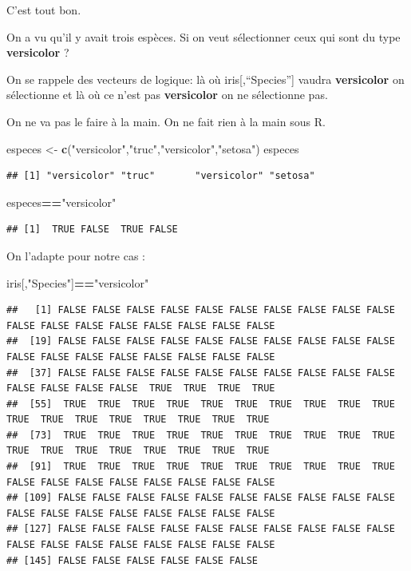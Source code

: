 \documentclass[
]{book}
\newenvironment{Shaded}{\begin{snugshade}}{\end{snugshade}}
\newcommand{\FunctionTok}[1]{\textcolor[rgb]{0.13,0.29,0.53}{\textbf{#1}}}
\newcommand{\NormalTok}[1]{#1}
\newcommand{\OtherTok}[1]{\textcolor[rgb]{0.56,0.35,0.01}{#1}}
\newcommand{\SpecialCharTok}[1]{\textcolor[rgb]{0.81,0.36,0.00}{\textbf{#1}}}
\newcommand{\StringTok}[1]{\textcolor[rgb]{0.31,0.60,0.02}{#1}}
\begin{document}
C'est tout bon.

On a vu qu'il y avait trois espèces. Si on veut sélectionner ceux qui sont du type
\textbf{versicolor} ?

On se rappele des vecteurs de logique: là où iris{[},``Species''{]} vaudra \textbf{versicolor}
on sélectionne et là où ce n'est pas \textbf{versicolor} on ne sélectionne pas.

On ne va pas le faire à la main. On ne fait rien à la main sous R.

\begin{Shaded}
\begin{Highlighting}[]
\NormalTok{especes }\OtherTok{\textless{}{-}} \FunctionTok{c}\NormalTok{(}\StringTok{"versicolor"}\NormalTok{,}\StringTok{"truc"}\NormalTok{,}\StringTok{"versicolor"}\NormalTok{,}\StringTok{"setosa"}\NormalTok{)}
\NormalTok{especes}
\end{Highlighting}
\end{Shaded}

\begin{verbatim}
## [1] "versicolor" "truc"       "versicolor" "setosa"
\end{verbatim}

\begin{Shaded}
\begin{Highlighting}[]
\NormalTok{especes}\SpecialCharTok{==}\StringTok{"versicolor"}
\end{Highlighting}
\end{Shaded}

\begin{verbatim}
## [1]  TRUE FALSE  TRUE FALSE
\end{verbatim}

On l'adapte pour notre cas :

\begin{Shaded}
\begin{Highlighting}[]
\NormalTok{iris[,}\StringTok{"Species"}\NormalTok{]}\SpecialCharTok{==}\StringTok{"versicolor"}
\end{Highlighting}
\end{Shaded}

\begin{verbatim}
##   [1] FALSE FALSE FALSE FALSE FALSE FALSE FALSE FALSE FALSE FALSE FALSE FALSE FALSE FALSE FALSE FALSE FALSE FALSE
##  [19] FALSE FALSE FALSE FALSE FALSE FALSE FALSE FALSE FALSE FALSE FALSE FALSE FALSE FALSE FALSE FALSE FALSE FALSE
##  [37] FALSE FALSE FALSE FALSE FALSE FALSE FALSE FALSE FALSE FALSE FALSE FALSE FALSE FALSE  TRUE  TRUE  TRUE  TRUE
##  [55]  TRUE  TRUE  TRUE  TRUE  TRUE  TRUE  TRUE  TRUE  TRUE  TRUE  TRUE  TRUE  TRUE  TRUE  TRUE  TRUE  TRUE  TRUE
##  [73]  TRUE  TRUE  TRUE  TRUE  TRUE  TRUE  TRUE  TRUE  TRUE  TRUE  TRUE  TRUE  TRUE  TRUE  TRUE  TRUE  TRUE  TRUE
##  [91]  TRUE  TRUE  TRUE  TRUE  TRUE  TRUE  TRUE  TRUE  TRUE  TRUE FALSE FALSE FALSE FALSE FALSE FALSE FALSE FALSE
## [109] FALSE FALSE FALSE FALSE FALSE FALSE FALSE FALSE FALSE FALSE FALSE FALSE FALSE FALSE FALSE FALSE FALSE FALSE
## [127] FALSE FALSE FALSE FALSE FALSE FALSE FALSE FALSE FALSE FALSE FALSE FALSE FALSE FALSE FALSE FALSE FALSE FALSE
## [145] FALSE FALSE FALSE FALSE FALSE FALSE
\end{verbatim}
\end{document}
